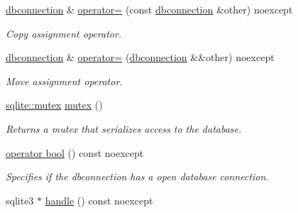 \begin{DoxyCompactItemize}
\hyperlink{a00004}{dbconnection} \& \hyperlink{a00004_ae7c52ec41d3dfb7f4c8a521af7673bde}{operator=} (const \hyperlink{a00004}{dbconnection} \&other) noexcept
\begin{DoxyCompactList}\small\item\em Copy assignment operator. \end{DoxyCompactList}\item 
\hyperlink{a00004}{dbconnection} \& \hyperlink{a00004_abd91c727842023d54fdb64e6e2e9ac3c}{operator=} (\hyperlink{a00004}{dbconnection} \&\&other) noexcept
\begin{DoxyCompactList}\small\item\em Move assignment operator. \end{DoxyCompactList}\item 
\hyperlink{a00009}{sqlite\-::mutex} \hyperlink{a00004_afa13431e657c74ba7beee63fa70eeb93}{mutex} ()
\begin{DoxyCompactList}\small\item\em Returns a mutex that serializes access to the database. \end{DoxyCompactList}\item 
\hyperlink{a00004_a8c0e145b3687659ec0f76949174651e0}{operator bool} () const noexcept
\begin{DoxyCompactList}\small\item\em Specifies if the dbconnection has a open database connection. \end{DoxyCompactList}\item 
\hypertarget{a00004_a1a9b022293133991f265c10c1f50800b}{sqlite3 $\ast$ \hyperlink{a00004_a1a9b022293133991f265c10c1f50800b}{handle} () const noexcept}\label{a00004_a1a9b022293133991f265c10c1f50800b}


\end{DoxyCompactItemize}
